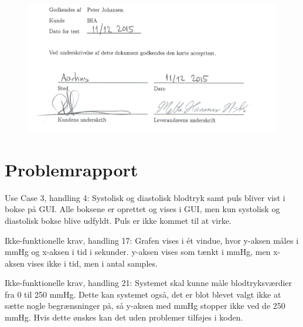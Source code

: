 
\begin{figure}[H]
	\centering
	\includegraphics[width=1.0\textwidth]{Figurer/UnderskriftAT}
\end{figure}



\newpage
\section{Problemrapport}
Use Case 3, handling 4: Systolisk og diastolisk blodtryk samt puls bliver vist i bokse på GUI. 
Alle boksene er oprettet og vises i GUI, men kun systolisk og diastolisk bokse blive udfyldt. Puls er ikke kommet til at virke. 

Ikke-funktionelle krav, handling 17: Grafen vises i ét vindue, hvor y-aksen måles i mmHg og x-aksen i tid i sekunder. y-aksen vises som tænkt i mmHg, men x-aksen vises ikke i tid, men i antal samples. 

Ikke-funktionelle krav, handling 21: Systemet skal kunne måle blodtryksværdier fra 0 til 250 mmHg. Dette kan systemet også, det er blot blevet valgt ikke at sætte nogle begrænsninger på, så y-aksen med mmHg stopper ikke ved de 250 mmHg. Hvis dette ønskes kan det uden problemer tilføjes i koden. 